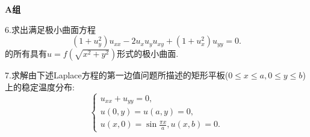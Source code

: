 \documentclass{ctexart}
\begin{document}


\noindent\textbf{A组}

6.求出满足极小曲面方程
\[(1+u_y^2)u_{xx}-2u_xu_yu_{xy}+(1+u_x^2)u_{yy}=0.\]
的所有具有$u=f(\sqrt{x^2+y^2})$形式的极小曲面.

7.求解由下述Laplace方程的第一边值问题所描述的矩形平板($0\le x\le a,0\le y\le b$)上的稳定温度分布:
\[\begin{cases}
	u_{xx}+u_{yy}=0,\\
	u(0,y)=u(a,y)=0,\\
	u(x,0)=\sin\frac{\pi x}{a},u(x,b)=0.
\end{cases}\]
\end{document}
